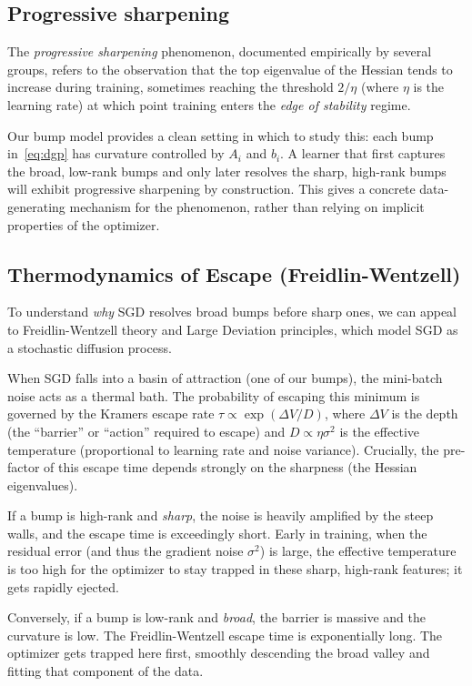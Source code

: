 \documentclass{article}
\begin{document}
\subsection{Progressive sharpening}

The \emph{progressive sharpening} phenomenon, documented empirically by
several groups, refers to the observation that the top eigenvalue of the
Hessian tends to increase during training, sometimes reaching the
threshold $2/\eta$ (where $\eta$ is the learning rate) at which point
training enters the \emph{edge of stability} regime.

Our bump model provides a clean setting in which to study this: each
bump in~\eqref{eq:dgp} has curvature controlled by $A_i$ and $b_i$.
A learner that first captures the broad, low-rank bumps and only later
resolves the sharp, high-rank bumps will exhibit progressive sharpening
by construction. This gives a concrete data-generating mechanism for
the phenomenon, rather than relying on implicit properties of the
optimizer.

\subsection{Thermodynamics of Escape (Freidlin-Wentzell)}

To understand \emph{why} SGD resolves broad bumps before sharp ones, we can appeal to Freidlin-Wentzell theory and Large Deviation principles, which model SGD as a stochastic diffusion process.

When SGD falls into a basin of attraction (one of our bumps), the mini-batch noise acts as a thermal bath. The probability of escaping this minimum is governed by the Kramers escape rate $\tau \propto \exp(\Delta V / D)$, where $\Delta V$ is the depth (the ``barrier'' or ``action'' required to escape) and $D \propto \eta \sigma^2$ is the effective temperature (proportional to learning rate and noise variance). Crucially, the pre-factor of this escape time depends strongly on the sharpness (the Hessian eigenvalues). 

If a bump is high-rank and \emph{sharp}, the noise is heavily amplified by the steep walls, and the escape time is exceedingly short. Early in training, when the residual error (and thus the gradient noise $\sigma^2$) is large, the effective temperature is too high for the optimizer to stay trapped in these sharp, high-rank features; it gets rapidly ejected. 

Conversely, if a bump is low-rank and \emph{broad}, the barrier is massive and the curvature is low. The Freidlin-Wentzell escape time is exponentially long. The optimizer gets trapped here first, smoothly descending the broad valley and fitting that component of the data. 
\end{document}
